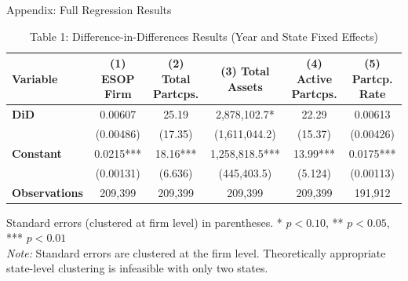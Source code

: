 \documentclass{beamer}
\begin{document}
\begin{frame}{Appendix: Full Regression Results}

\begin{table}
\centering
\caption*{Table 1: Difference-in-Differences Results (Year and State Fixed Effects)}
\tiny
\begin{tabular}{lccccc}
\toprule
Variable & (1) ESOP Firm & (2) Total Partcps. & (3) Total Assets & (4) Active Partcps. & (5) Partcp. Rate \\
\midrule
\textbf{DiD} & 0.00607 & 25.19 & 2,878,102.7* & 22.29 & 0.00613 \\
             & (0.00486) & (17.35) & (1,611,044.2) & (15.37) & (0.00426) \\
\textbf{Constant} & 0.0215*** & 18.16*** & 1,258,818.5*** & 13.99*** & 0.0175*** \\
                  & (0.00131) & (6.636) & (445,403.5) & (5.124) & (0.00113) \\
\midrule
\textbf{Observations} & 209,399 & 209,399 & 209,399 & 209,399 & 191,912 \\
\bottomrule
\end{tabular}
\end{table}

\vspace{0.5em}
\scriptsize
Standard errors (clustered at firm level) in parentheses. * $p<0.10$, ** $p<0.05$, *** $p<0.01$ \\
\vspace{0.3em}
\textit{Note:} Standard errors are clustered at the firm level. Theoretically appropriate state-level clustering is infeasible with only two states.

\end{frame}
\end{document}
